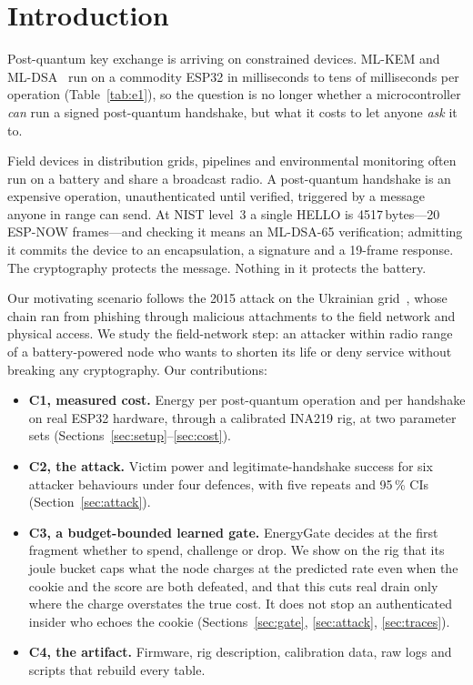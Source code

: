 \documentclass[conference]{IEEEtran}
\begin{document}
\section{Introduction}
Post-quantum key exchange is arriving on constrained devices. ML-KEM and ML-DSA~\cite{fips203,fips204} run on a
commodity ESP32 in milliseconds to tens of milliseconds per operation (Table~\ref{tab:e1}), so the question is no
longer whether a microcontroller \emph{can} run a signed post-quantum handshake, but what it costs to let anyone
\emph{ask} it to.

Field devices in distribution grids, pipelines and environmental monitoring often run on a battery and share a
broadcast radio. A post-quantum handshake is an expensive operation, unauthenticated until verified, triggered by a
message anyone in range can send. At NIST level~3 a single HELLO is 4517\,bytes---20 ESP-NOW frames---and checking
it means an ML-DSA-65 verification; admitting it commits the device to an encapsulation, a signature and a 19-frame
response. The cryptography protects the message. Nothing in it protects the battery.

Our motivating scenario follows the 2015 attack on the Ukrainian grid~\cite{ukraine2016}, whose chain ran from
phishing through malicious attachments to the field network and physical access. We study the field-network step:
an attacker within radio range of a battery-powered node who wants to shorten its life or deny service without
breaking any cryptography. Our contributions:
\begin{itemize}
\item \textbf{C1, measured cost.} Energy per post-quantum operation and per handshake on real ESP32 hardware,
through a calibrated INA219 rig, at two parameter sets (Sections~\ref{sec:setup}--\ref{sec:cost}).
\item \textbf{C2, the attack.} Victim power and legitimate-handshake success for six attacker behaviours under
four defences, with five repeats and 95\,\% CIs (Section~\ref{sec:attack}).
\item \textbf{C3, a budget-bounded learned gate.} EnergyGate decides at the first fragment whether to spend,
challenge or drop. We show on the rig that its joule bucket caps what the node charges at the predicted rate even
when the cookie and the score are both defeated, and that this cuts real drain only where the charge overstates
the true cost. It does not stop an authenticated insider who echoes the cookie (Sections~\ref{sec:gate},
\ref{sec:attack}, \ref{sec:traces}).
\item \textbf{C4, the artifact.} Firmware, rig description, calibration data, raw logs and scripts that rebuild
every table.
\end{itemize}
\end{document}
